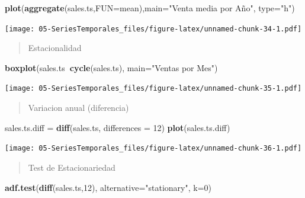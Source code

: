 \documentclass[]{book}
\newenvironment{Shaded}{\begin{snugshade}}{\end{snugshade}}
\newcommand{\DataTypeTok}[1]{\textcolor[rgb]{0.13,0.29,0.53}{#1}}
\newcommand{\DecValTok}[1]{\textcolor[rgb]{0.00,0.00,0.81}{#1}}
\newcommand{\KeywordTok}[1]{\textcolor[rgb]{0.13,0.29,0.53}{\textbf{#1}}}
\newcommand{\NormalTok}[1]{#1}
\newcommand{\OperatorTok}[1]{\textcolor[rgb]{0.81,0.36,0.00}{\textbf{#1}}}
\newcommand{\StringTok}[1]{\textcolor[rgb]{0.31,0.60,0.02}{#1}}
\begin{document}
\begin{Shaded}
\begin{Highlighting}[]
\KeywordTok{plot}\NormalTok{(}\KeywordTok{aggregate}\NormalTok{(sales.ts,}\DataTypeTok{FUN=}\NormalTok{mean),}\DataTypeTok{main=}\StringTok{"Venta media por Año"}\NormalTok{, }\DataTypeTok{type=}\StringTok{"h"}\NormalTok{)}
\end{Highlighting}
\end{Shaded}

\texttt{[image: 05-SeriesTemporales\_files/figure-latex/unnamed-chunk-34-1.pdf]}

\begin{quote}
Estacionalidad
\end{quote}

\begin{Shaded}
\begin{Highlighting}[]
\KeywordTok{boxplot}\NormalTok{(sales.ts}\OperatorTok{~}\KeywordTok{cycle}\NormalTok{(sales.ts), }\DataTypeTok{main=}\StringTok{"Ventas por Mes"}\NormalTok{)}
\end{Highlighting}
\end{Shaded}

\texttt{[image: 05-SeriesTemporales\_files/figure-latex/unnamed-chunk-35-1.pdf]}

\begin{quote}
Variacion anual (diferencia)
\end{quote}

\begin{Shaded}
\begin{Highlighting}[]
\NormalTok{sales.ts.diff =}\StringTok{ }\KeywordTok{diff}\NormalTok{(sales.ts, }\DataTypeTok{differences =} \DecValTok{12}\NormalTok{)}
\KeywordTok{plot}\NormalTok{(sales.ts.diff)}
\end{Highlighting}
\end{Shaded}

\texttt{[image: 05-SeriesTemporales\_files/figure-latex/unnamed-chunk-36-1.pdf]}

\begin{quote}
Test de Estacionariedad
\end{quote}

\begin{Shaded}
\begin{Highlighting}[]
\KeywordTok{adf.test}\NormalTok{(}\KeywordTok{diff}\NormalTok{(sales.ts,}\DecValTok{12}\NormalTok{), }\DataTypeTok{alternative=}\StringTok{"stationary"}\NormalTok{, }\DataTypeTok{k=}\DecValTok{0}\NormalTok{)}
\end{Highlighting}
\end{Shaded}
\end{document}

